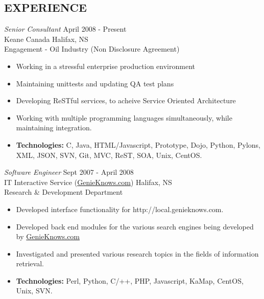 \documentclass[line,margin]{res}
\begin{document}
\begin{resume}
\section{EXPERIENCE}

   {\sl Senior Consultant} \hfill April 2008 - Present \\
    Keane Canada \hfill Halifax, NS \\
    Engagement - Oil Industry (Non Disclosure Agreement) \smallskip
    \begin{itemize}  \itemsep -2pt %
     \item Working in a stressful enterprise production environment
     \item Maintaining unittests and updating QA test plans
     \item Developing ReSTful services, to acheive Service Oriented Architecture
     \item Working with multiple programming languages
            simultaneously, while \\ maintaining integration.
     \item {\bf Technologies:} \hspace{1pt}
        C, Java, HTML/Javascript, Prototype, Dojo, Python, Pylons, \newline
        \hspace*{72pt} XML, JSON, SVN, Git, MVC, ReST, SOA, Unix, CentOS.
    \end{itemize}

   {\sl Software Engineer} \hfill Sept 2007 - April 2008 \\
    IT Interactive Service (\href{http://www.genieknows.com}{GenieKnows.com}) \hfill Halifax, NS \\
    Research {\&} Development Department \smallskip
    \begin{itemize}  \itemsep -2pt %
     \item Developed interface functionality for
             http://local.genieknows.com.
     \item Developed back end modules for the various search
             engines being developed by
             \href{http://www.genieknows.com}{GenieKnows.com}
     \item Investigated and presented various research topics
             in the fields of information retrieval.
     \item {\bf Technologies:} \hspace{1pt}
        Perl, Python, C/++, PHP, Javascript, KaMap, CentOS, \\
        \hspace*{72pt} Unix, SVN.
    \end{itemize}


\end{resume}
\end{document}
